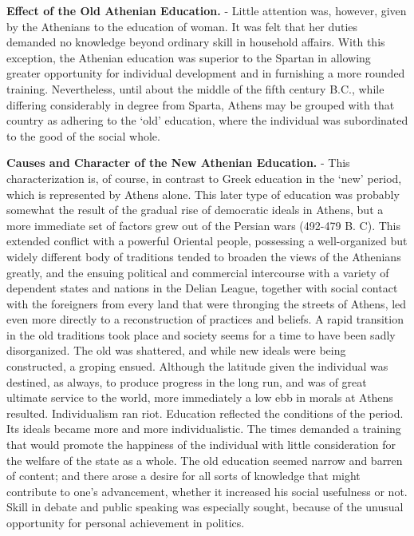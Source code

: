 \documentclass[]{book}
\begin{document}
\textbf{Effect of the Old Athenian Education.} - Little attention was, however, given by the Athenians to the education of woman. It was felt that her duties demanded no knowledge beyond ordinary skill in household affairs. With this exception, the Athenian education was superior to the Spartan in allowing greater opportunity for individual development and in furnishing a more rounded training. Nevertheless, until about the middle of the fifth century B.C., while differing considerably in degree from Sparta, Athens may be grouped with that country as adhering to the `old' education, where the individual was subordinated to the good of the social whole.

\textbf{Causes and Character of the New Athenian Education.} - This characterization is, of course, in contrast to Greek education in the `new' period, which is represented by Athens alone. This later type of education was probably somewhat the result of the gradual rise of democratic ideals in Athens, but a more immediate set of factors grew out of the Persian wars (492-479 B. C). This extended conflict with a powerful Oriental people, possessing a well-organized but widely different body of traditions tended to broaden the views of the Athenians greatly, and the ensuing political and commercial intercourse with a variety of dependent states and nations in the Delian League, together with social contact with the foreigners from every land that were thronging the streets of Athens, led even more directly to a reconstruction of practices and beliefs. A rapid transition in the old traditions took place and society seems for a time to have been sadly disorganized. The old was shattered, and while new ideals were being constructed, a groping ensued. Although the latitude given the individual was destined, as always, to produce progress in the long run, and was of great ultimate service to the world, more immediately a low ebb in morals at Athens resulted. Individualism ran riot. Education reflected the conditions of the period. Its ideals became more and more individualistic. The times demanded a training that would promote the happiness of the individual with little consideration for the welfare of the state as a whole. The old education seemed narrow and barren of content; and there arose a desire for all sorts of knowledge that might contribute to one's advancement, whether it increased his social usefulness or not. Skill in debate and public speaking was especially sought, because of the unusual opportunity for personal achievement in politics.
\end{document}
